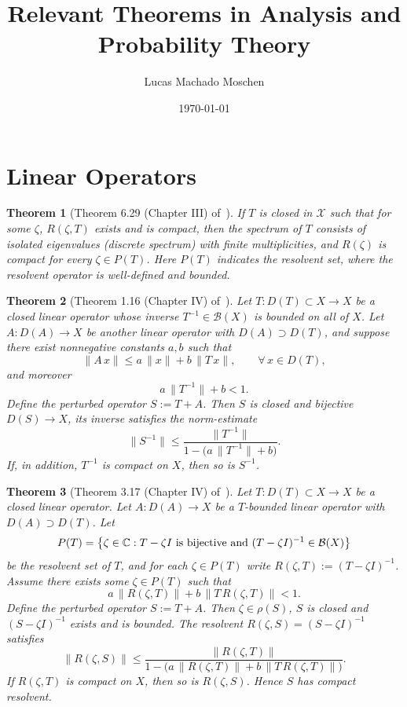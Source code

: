 \documentclass[a4paper, notitlepage, 10pt]{article}
\title{\Large \bfseries Relevant Theorems in Analysis and Probability Theory}
\date{\today}
\author{Lucas Machado Moschen}
\affil{\small Department of Mathematics, Imperial College London}
\newcommand{\Space}{\mathcal{X}}
\newcommand{\C}{\mathbb{C}}
\newcommand{\D}{D}
\newcommand{\B}{\mathcal{B}}
\newtheorem{theorem}{Theorem}[section]
\theoremstyle{definition}
\theoremstyle{customstyle}
\theoremstyle{definition}
\theoremstyle{remark}
\begin{document}
\maketitle


\section{Linear Operators}

\begin{theorem}[Theorem 6.29 (Chapter III) of~\cite{kato2013perturbation}]
    If $T$ is closed in $\Space$ such that for some $\zeta$, $R(\zeta, T)$ exists and is compact, then the spectrum of $T$ consists of isolated eigenvalues (discrete spectrum) with finite multiplicities, and $R(\zeta)$ is compact for every $\zeta \in P(T)$.
    Here $P(T)$ indicates the resolvent set, where the resolvent operator is well-defined and bounded.  
\end{theorem}

\begin{theorem}[Theorem 1.16 (Chapter IV) of~\cite{kato2013perturbation}]
    Let $T \colon \D(T)\subset X \longrightarrow X$ be a closed linear operator whose inverse \(T^{-1}\in\B(X)\) is bounded on all of \(X\).
    Let $A \colon \D(A)\longrightarrow X$ be another linear operator with \(\D(A) \supset \D(T)\), and suppose there exist nonnegative constants \(a,b\) such that
    \[
    \|A\,x\| \le a\,\|x\| + b\,\|T\,x\|, \qquad \forall\,x\in\D(T),
    \]
    and moreover
    \[
    a\,\|T^{-1}\| + b <1.
    \]
    Define the perturbed operator $S := T + A$. 
    Then \(S\) is closed and bijective \(\D(S)\to X\), its inverse satisfies the norm-estimate
    \[
        \|S^{-1}\| \le \frac{\|T^{-1}\|}{1 - \bigl(a\,\|T^{-1}\|+b\bigr)}.
    \]
   If, in addition, \(T^{-1}\) is compact on \(X\), then so is \(S^{-1}\).
\end{theorem}


\begin{theorem}[Theorem 3.17 (Chapter IV) of~\cite{kato2013perturbation}]
    Let $T \colon \D(T)\subset X \longrightarrow X$ be a closed linear operator.
    Let $A \colon \D(A)\longrightarrow X$ be a $T$-bounded linear operator with \(\D(A) \supset \D(T)\).
    Let
    \[
        P(T) = \bigl\{\zeta\in\C : T - \zeta I \hbox{ is bijective and }(T-\zeta I)^{-1}\in\B(X)\bigr\}
    \]
    be the resolvent set of \(T\), and for each \(\zeta\in P(T)\) write $R(\zeta,T) :=(T-\zeta I)^{-1}$.
    Assume there exists some \(\zeta\in P(T)\) such that
    \[
        a\,\bigl\|R(\zeta,T)\bigr\| + b\,\bigl\|T\,R(\zeta,T)\bigr\| <1.
    \]
    Define the perturbed operator $S := T + A$. 
    Then \(\zeta\in\rho(S)\), \(S\) is closed and \((S-\zeta I)^{-1}\) exists and is bounded.
    The resolvent \(R(\zeta,S)=(S-\zeta I)^{-1}\) satisfies
    \[
        \bigl\|R(\zeta,S)\bigr\| \le \frac{\|R(\zeta,T)\|}{1 - \bigl(a\,\|R(\zeta,T)\| + b\,\|T\,R(\zeta,T)\|\bigr)}.
    \]
    If \(R(\zeta,T)\) is compact on \(X\), then so is \(R(\zeta,S)\). Hence \(S\) has compact resolvent.
\end{theorem}
\end{document}

